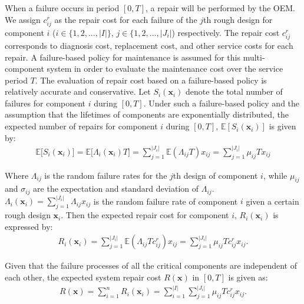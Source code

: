 \documentclass[preprint,12pt]{elsarticle}
\begin{document}
When a failure occurs in period $[0, T]$, a repair will be performed by the OEM. We assign $c^r_{ij}$ as the repair cost for each failure of the $j$th rough design for component $i$ ($i \in \{1,2,...,\lvert I \rvert \}$, $j \in \{1,2,..., \lvert J_{i} \rvert $) respectively. The repair cost $c^r_{ij}$ corresponds to diagnosis cost, replacement cost, and other service costs for each repair. A failure-based policy for maintenance is assumed for this multi-component system in order to evaluate the maintenance cost over the service period $T$. The evaluation of repair cost based on a failure-based policy is relatively accurate and conservative. Let $S_{i}(\boldsymbol{x}_{i})$ denote the total number of failures for component $i$ during $[0,T]$. Under such a failure-based policy and the assumption that the lifetimes of components are exponentially distributed, the expected number of repairs for component $i$ during $[0,T]$, $\mathbb{E}[S_{i}(\boldsymbol{x}_{i})]$ is given by:
\begin {eqnarray}
\mathbb{E}\bigg[S_{i}(\boldsymbol{x}_{i})\bigg]=\mathbb{E}\bigg[\Lambda_{i}(\boldsymbol{x}_{i})T\bigg] =\sum_{j=1}^{\rvert J_{i} \lvert}{\mathbb{E}(\Lambda_{ij}T)x_{ij}}=\sum_{j=1}^{\rvert J_{i} \lvert}{\mu_{ij}T}x_{ij}
\end {eqnarray}

Where $\Lambda_{ij}$ is the random failure rates for the $j$th design of component $i$, while $\mu_{ij}$ and $\sigma_{ij}$ are the expectation and standard deviation of $\Lambda_{ij}$. $\Lambda_{i}(\boldsymbol{x}_{i})=\sum_{j=1}^{\rvert J_{i} \lvert}{\Lambda_{ij}x_{ij}}$ is the random failure rate of component $i$ given a certain rough design $\boldsymbol{x}_{i}$. Then the expected repair cost for component $i$, $R_{i}(\boldsymbol{x}_{i})$ is expressed by:
\begin {eqnarray}
R_{i}(\boldsymbol{x}_{i}) = \sum_{j=1}^{\rvert J_{i} \lvert}{\mathbb{E}(\Lambda_{ij}Tc^r_{ij})x_{ij}}= \sum_{j=1}^{\rvert J_{i} \lvert}{\mu_{ij}Tc^r_{ij}}x_{ij}. \label{ERi}
\end {eqnarray}

Given that the failure processes of all the critical components are independent of each other, the expected system repair cost $R(\boldsymbol{x})$ in $[0,T]$ is given as:
\begin {eqnarray}
 R(\boldsymbol{x}) = \sum_{i=1}^{n}{R_{i}(\boldsymbol{x}_{i})} = \sum_{i=1}^{\rvert I \lvert}\sum_{j=1}^{\rvert J_{i} \lvert}{\mu_{ij}Tc^r_{ij}}x_{ij}.\label{ER}
\end {eqnarray}
\end{document}
